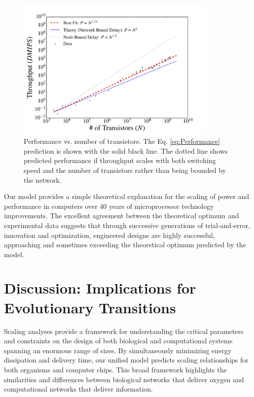 \documentclass[12pt]{article}
\begin{document}
\begin{figure}[!h]
\centering
\includegraphics[height=70mm]{Figures/ChipsThroughputScaling.pdf}
\caption{Performance vs. number of transistors. The
  Eq. \ref{eq:Performance} prediction is shown with the solid black
  line.  The dotted line shows predicted performance if throughput scales with
  both switching speed and the number of transistors rather than being bounded
by the network.}
\label{fig:throughput}
\end{figure}

Our model provides a simple theoretical explanation for the scaling of power
and performance in computers over 40 years of microprocessor technology
improvements.  The excellent agreement between the theoretical optimum and
experimental data suggests that through successive generations of
trial-and-error, innovation and optimization, engineered designs are highly
successful, approaching and sometimes exceeding the theoretical optimum predicted by the model.


\section{Discussion: Implications for Evolutionary Transitions}
\label{sec:discussion}

Scaling analyses provide a framework for understanding the critical parameters and constraints on the design of both biological and computational systems spanning an
enormous range of sizes.  By simultaneously minimizing energy dissipation and delivery
time, our unified model 
predicts scaling relationships for both
organisms and computer chips.  This broad framework highlights the similarities
and differences between biological networks that deliver oxygen and
computational networks that deliver information. 
\end{document}
